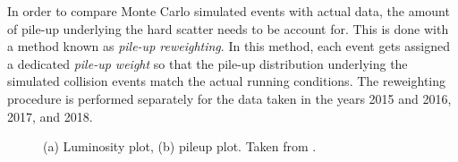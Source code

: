 In order to compare Monte Carlo simulated events with actual data, the amount of pile-up underlying the hard scatter needs to be account for. This is done with a method known as \emph{pile-up reweighting}. In this method, each event gets assigned a dedicated \emph{pile-up weight} so that the pile-up distribution underlying the simulated collision events match the actual running conditions. The reweighting procedure is performed separately for the data taken in the years 2015 and 2016, 2017, and 2018.



\begin{figure}
    \caption{(a) Luminosity plot, (b) pileup plot. Taken from .}
    \label{fig:run-2-data-taking}
\end{figure}
